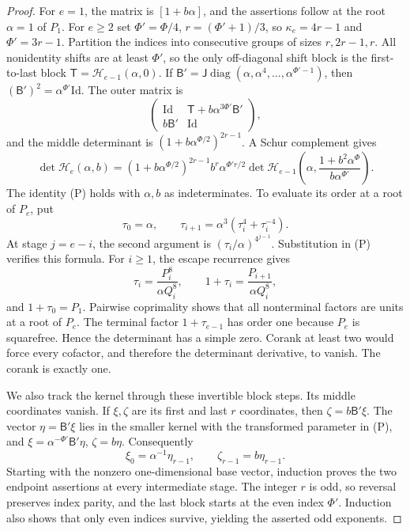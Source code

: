 \documentclass[11pt,a4paper,reqno]{amsart}
\numberwithin{equation}{section}
\theoremstyle{plain}
\theoremstyle{definition}
\theoremstyle{remark}
\newcommand{\Id}{\mathrm{Id}}
\DeclareMathOperator{\diag}{diag}
\begin{document}
\begin{proof}
For $e=1$, the matrix is $[1+b\alpha]$, and the assertions follow
at the root $\alpha=1$ of $P_1$.
For $e\geq2$ set $\Phi'=\Phi/4$, $r=(\Phi'+1)/3$, so $\kappa_e=4r-1$ and $\Phi'=3r-1$.
Partition the indices into consecutive groups of sizes $r,2r-1,r$. All nonidentity
shifts are at least $\Phi'$, so the only off-diagonal shift block is the
first-to-last block $\mathsf T=\mathcal H_{e-1}(\alpha,0)$. If $\mathsf B'=\mathsf
J\diag(\alpha,\alpha^4,\ldots,\alpha^{\Phi'-1})$, then $(\mathsf
B')^2=\alpha^{\Phi'}\Id$. The outer matrix is
\[
\begin{pmatrix}\Id&\mathsf T+b\alpha^{3\Phi'}\mathsf B'\\b\mathsf B'&\Id\end{pmatrix},
\]
and the middle determinant is $(1+b\alpha^{\Phi/2})^{2r-1}$. A Schur complement gives
\[
\det \mathcal H_e(\alpha,b)=
(1+b\alpha^{\Phi/2})^{2r-1}b^r\alpha^{\Phi'r/2}
\det \mathcal H_{e-1}\left(\alpha,\frac{1+b^2\alpha^\Phi}{b\alpha^{\Phi'}}\right).
\tag{P}
\]
The identity (P) holds with $\alpha,b$ as indeterminates.
To evaluate its order at a root of $P_e$, put
\[
\tau_0=\alpha,\qquad
\tau_{i+1}=\alpha^3(\tau_i^4+\tau_i^{-4}).
\]
At stage $j=e-i$, the second argument is
$(\tau_i/\alpha)^{4^{j-1}}$. Substitution in (P) verifies this formula.
For $i\geq1$, the escape recurrence gives
\[
\tau_i=\frac{P_i^8}{\alpha Q_i^8},\qquad
1+\tau_i=\frac{P_{i+1}}{\alpha Q_i^8},
\]
and $1+\tau_0=P_1$.
Pairwise coprimality shows that all nonterminal factors are units
at a root of $P_e$. The terminal factor $1+\tau_{e-1}$ has order one
because $P_e$ is squarefree. Hence the determinant has a simple zero.
Corank at least two would force every cofactor, and therefore the
determinant derivative, to vanish. The corank is exactly one.

We also track the kernel through these invertible block steps. Its middle coordinates
vanish. If $\xi,\zeta$ are its first and last $r$ coordinates, then $\zeta=b\mathsf
B'\xi$. The vector $\eta=\mathsf B'\xi$ lies in the smaller kernel with the
transformed parameter in (P), and $\xi=\alpha^{-\Phi'}\mathsf B'\eta$, $\zeta=b\eta$.
Consequently
\[
\xi_0=\alpha^{-1}\eta_{r-1},\qquad\zeta_{r-1}=b\eta_{r-1}.
\]
Starting with the nonzero one-dimensional base vector, induction proves the two
endpoint assertions at every intermediate stage. The integer $r$ is odd, so reversal
preserves index parity, and the last block starts at the even index $\Phi'$.
Induction also shows that only even indices survive, yielding the asserted odd
exponents.
\end{proof}
\end{document}
